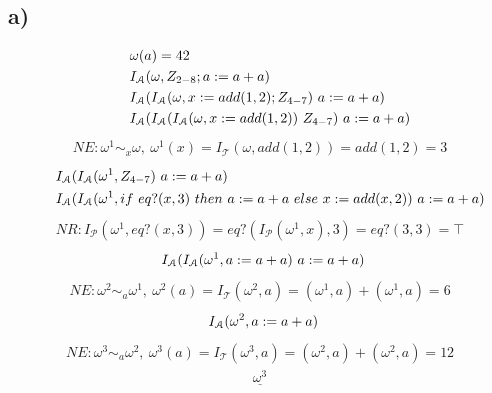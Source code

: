 \documentclass[12pt,runningheads,a4paper]{llncs}
\begin{document}
\subsection*{a)}
\begin{align}
&\indent\omega(a) = 42\\
&\indent I_\mathcal{A}(\omega, Z_{2-8}; a := a+a)\\
&\indent I_\mathcal{A}(I_\mathcal{A}(\omega, x := add(1,2); Z_{4-7})\ a := a + a)\\
&\indent I_\mathcal{A}( I_\mathcal{A}(I_\mathcal{A}(\omega, x := add(1,2))\ Z_{4-7})\ a := a + a)
\end{align}
\begin{gather*}
NE: \omega^1 \sim_x \omega,\: \omega^1(x) = I_\mathcal{T}(\omega, add(1,2)) = add(1,2) = 3
\end{gather*}
\begin{align}
&\indent I_\mathcal{A}(I_\mathcal{A}(\omega^1, Z_{4-7})\ a := a+a)\\
&\indent I_\mathcal{A}(I_\mathcal{A}(\omega^1, if\ eq?(x,3)\ then\ a := a + a\ else\ x := add(x,2))\ a := a+a)
\end{align}
\begin{gather*}
NR: I_\mathcal{P}(\omega^1, eq?(x,3)) = eq?(I_\mathcal{P}(\omega^1,x),3) = eq?(3,3) = \top
\end{gather*}
\begin{align}
&\indent I_\mathcal{A}(I_\mathcal{A}(\omega^1, a := a + a)\ a := a+a)
\end{align}
\begin{gather*}
NE: \omega^2 \sim_a \omega^1,\: \omega^2(a) = I_\mathcal{T}(\omega^2,a ) = (\omega^1,a )+(\omega^1,a )  = 6
\end{gather*}
\begin{align}
&\indent I_\mathcal{A}(\omega^2, a := a+a)
\end{align}
\begin{gather*}
NE: \omega^3 \sim_a \omega^2,\: \omega^3(a) = I_\mathcal{T}(\omega^3,a ) = (\omega^2,a )+(\omega^2,a )  = 12
\end{gather*}
\begin{align}
\underline{\omega^3}
\end{align}
\end{document}
